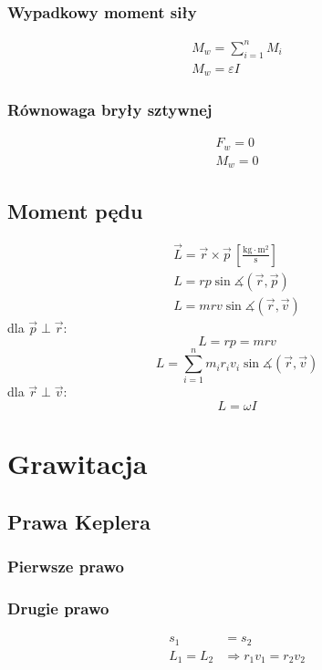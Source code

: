 \documentclass{article}
\numberwithin{equation}{section}
\newcommand{\unit}[1]{\, \left[\mathrm{#1}\right]}
\begin{document}
      \subsubsection{Wypadkowy moment siły}
        \begin{gather}
          M_w = \sum_{i=1}^n M_i\\
          M_w = \varepsilon I
        \end{gather}
      \subsubsection{Równowaga bryły sztywnej}
        \begin{gather}
          F_w = 0\\
          M_w = 0
        \end{gather}
    \subsection{Moment pędu}
      \begin{gather}
        \vec L = \vec r \times\vec p \unit{\frac{kg\cdot m^2}{s}}\\
        L = rp\sin\measuredangle (\vec r,\vec p)\\
        L = mrv\sin\measuredangle (\vec r,\vec v)
      \end{gather}
      dla $\vec p \perp \vec r$:
      \begin{equation}
        L = rp = mrv
      \end{equation}
      \begin{equation}
        L = \sum_{i=1}^n m_ir_iv_i\sin\measuredangle (\vec r,\vec v)
      \end{equation}
      dla $\vec r \perp \vec v$:
      \begin{equation}
        L = \omega I
      \end{equation}

  \newpage
  \section{Grawitacja}
    \subsection{Prawa Keplera}
      \subsubsection{Pierwsze prawo}
      \subsubsection{Drugie prawo}
        \begin{align}
          s_1 &= s_2\\
          L_1 = L_2 &\Rightarrow r_1v_1 = r_2v_2
        \end{align}
\end{document}
